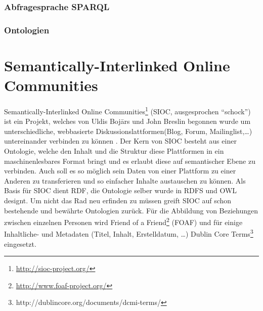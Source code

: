 \subsubsection{Abfragesprache SPARQL} %
\label{ssub:abfragesprache_sparql}


\subsubsection{Ontologien} %
\label{ssub:ontologien}



\section{Semantically-Interlinked Online Communities} %
\label{sec:verw_arbeiten_sioc}

Semantically-Interlinked Online Communities\footnote{\url{http://sioc-project.org/}} (SIOC, ausgesprochen \enquote{schock}) ist ein Projekt, welches von Uldis Boj\=ars und John Breslin begonnen wurde um unterschiedliche, webbasierte Diskussionslattformen(Blog, Forum, Mailinglist,\dots) untereinander verbinden zu können \cite{Breslin2005}. Der Kern von SIOC besteht aus einer Ontologie, welche den Inhalt und die Struktur diese Plattformen in ein maschinenlesbares Format bringt und es erlaubt diese auf semantischer Ebene zu verbinden. Auch soll es so möglich sein Daten von einer Plattform zu einer Anderen zu transferieren und so einfacher Inhalte austauschen zu können. Als Basis für SIOC dient RDF, die Ontologie selber wurde in RDFS und OWL designt. Um nicht das Rad neu erfinden zu müssen greift SIOC auf schon bestehende und bewährte Ontologien zurück. Für die Abbildung von Beziehungen zwischen einzelnen Personen wird Friend of a Friend\footnote{\url{http://www.foaf-project.org/}} (FOAF) und für einige Inhaltliche- und Metadaten (Titel, Inhalt, Erstelldatum, \dots) Dublin Core Terms\footnote{http://dublincore.org/documents/dcmi-terms/} eingesetzt.

